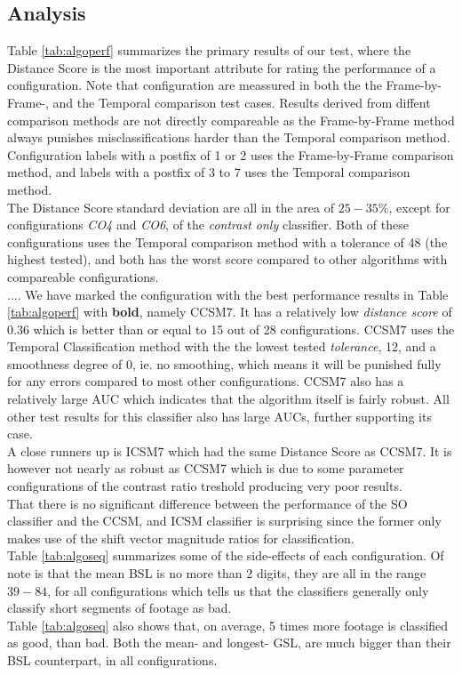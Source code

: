 \subsection{Analysis}
%
Table \ref{tab:algoperf} summarizes the primary results of our test, where the Distance Score is the most important attribute for rating the performance of a configuration. Note that configuration are meassured in both the the Frame-by-Frame-, and the Temporal comparison test cases. Results derived from diffent comparison methods are not directly compareable as the Frame-by-Frame method always punishes misclassifications harder than the Temporal comparison method. Configuration labels with a postfix of 1 or 2 uses the Frame-by-Frame comparison method, and labels with a postfix of 3 to 7 uses the Temporal comparison method.\\
The Distance Score standard deviation are all in the area of $25-35\%$, except for configurations \textit{CO4} and \textit{CO6}, of the \textit{contrast only} classifier. Both of these configurations uses the Temporal comparison method with a tolerance of 48 (the highest tested), and both has the worst score compared to other algorithms with compareable configurations.\\
....
We have marked the configuration with the best performance results in Table \ref{tab:algoperf} with \textbf{bold}, namely CCSM7. It has a relatively low \textit{distance score} of $0.36$ which is better than or equal to 15 out of 28 configurations. CCSM7 uses the Temporal Classification method with the the lowest tested \textit{tolerance}, 12, and a smoothness degree of 0, ie. no smoothing, which means it will be punished fully for any errors compared to most other configurations. CCSM7 also has a relatively large AUC which indicates that the algorithm itself is fairly robust. All other test results for this classifier also has large AUCs, further supporting its case.\\
A close runners up is ICSM7 which had the same Distance Score as CCSM7. It is however not nearly as robust as CCSM7 which is due to some parameter configurations of the contrast ratio treshold producing very poor results.\\
That there is no significant difference between the performance of the SO classifier and the CCSM, and ICSM classifier is surprising since the former only makes use of the shift vector magnitude ratios for classification.\\
Table \ref{tab:algoseq} summarizes some of the side-effects of each configuration. Of note is that the mean BSL is no more than 2 digits, they are all in the range $39-84$, for all configurations which tells us that the classifiers generally only classify short segments of footage as bad.\\
Table \ref{tab:algoseq} also shows that, on average, 5 times more footage is classified as good, than bad. Both the mean- and longest- GSL, are much bigger than their BSL counterpart, in all configurations.\\
%

